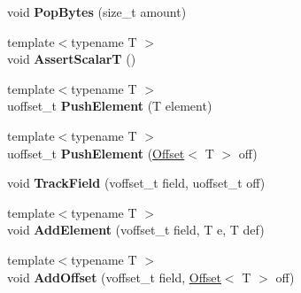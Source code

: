 \begin{DoxyCompactItemize}
\mbox{\label{classflatbuffers_1_1FlatBufferBuilder_a3c9d6c4515c7b7a03dbb8de3af2b297d}} 
void {\bfseries Pop\+Bytes} (size\+\_\+t amount)
\item 
\mbox{\label{classflatbuffers_1_1FlatBufferBuilder_a035b0501d9361db9e2c8a5ba75e81271}} 
{\footnotesize template$<$typename T $>$ }\\void {\bfseries Assert\+ScalarT} ()
\item 
\mbox{\label{classflatbuffers_1_1FlatBufferBuilder_a6c7436cb5a33ef3e1ee81181eabb54b4}} 
{\footnotesize template$<$typename T $>$ }\\uoffset\+\_\+t {\bfseries Push\+Element} (T element)
\item 
\mbox{\label{classflatbuffers_1_1FlatBufferBuilder_a64a80cb4154b007e2d83271828632239}} 
{\footnotesize template$<$typename T $>$ }\\uoffset\+\_\+t {\bfseries Push\+Element} (\hyperlink{structflatbuffers_1_1Offset}{Offset}$<$ T $>$ off)
\item 
\mbox{\label{classflatbuffers_1_1FlatBufferBuilder_a6b996a37c6fe80dbcb5f0885209bbe7b}} 
void {\bfseries Track\+Field} (voffset\+\_\+t field, uoffset\+\_\+t off)
\item 
\mbox{\label{classflatbuffers_1_1FlatBufferBuilder_afc3db5c5a35447b73643b2cd61c06dbd}} 
{\footnotesize template$<$typename T $>$ }\\void {\bfseries Add\+Element} (voffset\+\_\+t field, T e, T def)
\item 
\mbox{\label{classflatbuffers_1_1FlatBufferBuilder_a150264d1b4b4efe0e31285b4fcac99d3}} 
{\footnotesize template$<$typename T $>$ }\\void {\bfseries Add\+Offset} (voffset\+\_\+t field, \hyperlink{structflatbuffers_1_1Offset}{Offset}$<$ T $>$ off)
\item 
\mbox{\label{classflatbuffers_1_1FlatBufferBuilder_a263598624cca61dd385435ddaf399aca}} 

\end{DoxyCompactItemize}
